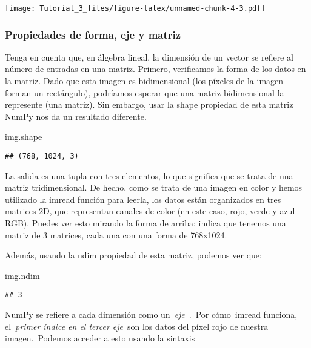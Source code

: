 \documentclass[
]{article}
\newenvironment{Shaded}{\begin{snugshade}}{\end{snugshade}}
\newcommand{\NormalTok}[1]{#1}
\begin{document}
\texttt{[image: Tutorial\_3\_files/figure-latex/unnamed-chunk-4-3.pdf]}

\hypertarget{propiedades-de-forma-eje-y-matriz}{%
\subsubsection{Propiedades de forma, eje y
matriz}\label{propiedades-de-forma-eje-y-matriz}}

Tenga en cuenta que, en álgebra lineal, la dimensión de un vector se
refiere al número de entradas en una matriz. Primero, verificamos la
forma de los datos en la matriz. Dado que esta imagen es bidimensional
(los píxeles de la imagen forman un rectángulo), podríamos esperar que
una matriz bidimensional la represente (una matriz). Sin embargo, usar
la shape propiedad de esta matriz NumPy nos da un resultado diferente.

\begin{Shaded}
\begin{Highlighting}[]
\NormalTok{img.shape}
\end{Highlighting}
\end{Shaded}

\begin{verbatim}
## (768, 1024, 3)
\end{verbatim}

La salida es una tupla con tres elementos, lo que significa que se trata
de una matriz tridimensional. De hecho, como se trata de una imagen en
color y hemos utilizado la imread función para leerla, los datos están
organizados en tres matrices 2D, que representan canales de color (en
este caso, rojo, verde y azul - RGB). Puedes ver esto mirando la forma
de arriba: indica que tenemos una matriz de 3 matrices, cada una con una
forma de 768x1024.

Además, usando la ndim propiedad de esta matriz, podemos ver que:

\begin{Shaded}
\begin{Highlighting}[]
\NormalTok{img.ndim}
\end{Highlighting}
\end{Shaded}

\begin{verbatim}
## 3
\end{verbatim}

NumPy se refiere a cada dimensión como un~\emph{eje}~.~Por cómo~imread
funciona, el~\emph{primer índice en el tercer eje}~son los datos del
píxel rojo de nuestra imagen.~Podemos acceder a esto usando la sintaxis
\end{document}
